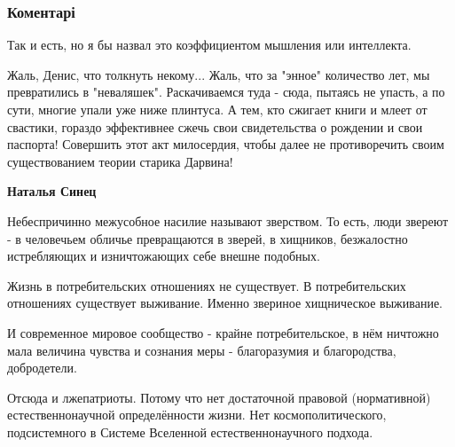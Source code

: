  
 
 
 
 
\subsubsection{Коментарі}
\label{sec:14_09_2021.fb.zharkih_denis.1.koeficient_intelligentnost.cmt}

\begin{itemize} %
Так и есть, но я бы назвал это коэффициентом мышления или интеллекта.


Жаль, Денис, что толкнуть некому... Жаль, что за "энное" количество лет, мы
превратились в "неваляшек". Раскачиваемся туда - сюда, пытаясь не упасть, а по
сути, многие упали уже ниже плинтуса. А тем, кто сжигает книги и млеет от
свастики, гораздо эффективнее сжечь свои свидетельства о рождении и свои
паспорта! Совершить этот акт милосердия, чтобы далее не противоречить своим
существованием теории старика Дарвина!

\begin{itemize} %

 
\textbf{Наталья Синец} 

Небеспричинно межусобное насилие называют зверством. То есть, люди звереют - в
человечьем обличье превращаются в зверей, в хищников, безжалостно истребляющих
и изничтожающих себе внешне подобных.

Жизнь в потребительских отношениях не существует. В потребительских отношениях
существует выживание. Именно звериное хищническое выживание.

И современное мировое сообщество - крайне потребительское, в нём ничтожно мала
величина чувства и сознания меры - благоразумия и благородства, добродетели.

Отсюда и лжепатриоты. Потому что нет достаточной правовой (нормативной)
естественнонаучной определённости жизни. Нет космополитического, подсистемного
в Системе Вселенной естественнонаучного подхода.


\end{itemize}
\end{itemize}
